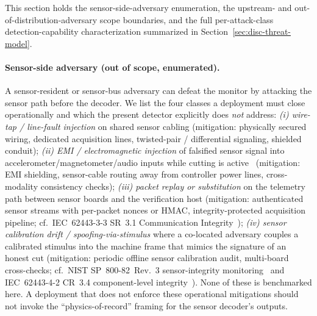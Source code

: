\documentclass[11pt,a4paper]{article}
\begin{document}
This section holds the sensor-side-adversary enumeration, the upstream- and
out-of-distribution-adversary scope boundaries, and the full per-attack-class
detection-capability characterization summarized in
Section~\ref{sec:disc-threat-model}.

\paragraph{Sensor-side adversary (out of scope, enumerated).} A sensor-resident or sensor-bus adversary can defeat the monitor by attacking the sensor path before the decoder. We list the four classes a deployment must close operationally and which the present detector explicitly does \emph{not} address: \emph{(i) wire-tap / line-fault injection} on shared sensor cabling (mitigation: physically secured wiring, dedicated acquisition lines, twisted-pair / differential signaling, shielded conduit); \emph{(ii) EMI / electromagnetic injection} of falsified sensor signal into accelerometer/magnetometer/audio inputs while cutting is active~\cite{nist2023sp80082} (mitigation: EMI shielding, sensor-cable routing away from controller power lines, cross-modality consistency checks); \emph{(iii) packet replay or substitution} on the telemetry path between sensor boards and the verification host (mitigation: authenticated sensor streams with per-packet nonces or HMAC, integrity-protected acquisition pipeline; cf.\ IEC~62443-3-3 SR~3.1 Communication Integrity~\cite{iec62443-3-3}); \emph{(iv) sensor calibration drift / spoofing-via-stimulus} where a co-located adversary couples a calibrated stimulus into the machine frame that mimics the signature of an honest cut (mitigation: periodic offline sensor calibration audit, multi-board cross-checks; cf.\ NIST SP~800-82~Rev.~3 sensor-integrity monitoring~\cite{nist2023sp80082} and IEC~62443-4-2 CR~3.4 component-level integrity~\cite{iec62443-4-2}). None of these is benchmarked here. A deployment that does not enforce these operational mitigations should not invoke the ``physics-of-record'' framing for the sensor decoder's outputs.
\end{document}
